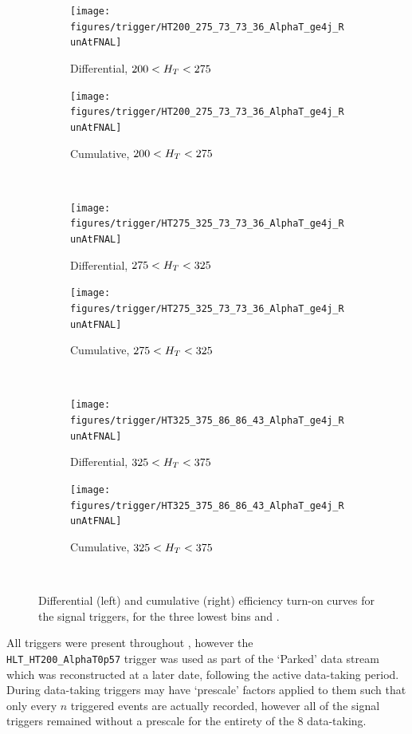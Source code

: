 \begin{figure}[p!]
  \centering
    \begin{subfigure}[b]{0.48\textwidth}
      \texttt{[image: figures/trigger/HT200\_275\_73\_73\_36\_AlphaT\_ge4j\_RunAtFNAL]}
      \caption{Differential, $200 < H_T < 275 $~\gev}
    \end{subfigure}
    \begin{subfigure}[b]{0.48\textwidth}
      \texttt{[image: figures/trigger/HT200\_275\_73\_73\_36\_AlphaT\_ge4j\_RunAtFNAL]}
      \caption{Cumulative, $200 < H_T < 275 $~\gev}
    \end{subfigure} \\
    \begin{subfigure}[b]{0.48\textwidth}
      \texttt{[image: figures/trigger/HT275\_325\_73\_73\_36\_AlphaT\_ge4j\_RunAtFNAL]}
      \caption{Differential, $275 < H_T < 325 $~\gev}
    \end{subfigure}
    \begin{subfigure}[b]{0.48\textwidth}
      \texttt{[image: figures/trigger/HT275\_325\_73\_73\_36\_AlphaT\_ge4j\_RunAtFNAL]}
      \caption{Cumulative, $275 < H_T < 325 $~\gev}
    \end{subfigure} \\
    \begin{subfigure}[b]{0.48\textwidth}
      \texttt{[image: figures/trigger/HT325\_375\_86\_86\_43\_AlphaT\_ge4j\_RunAtFNAL]}
      \caption{Differential, $325 < H_T < 375 $~\gev}
    \end{subfigure}
    \begin{subfigure}[b]{0.48\textwidth}
      \texttt{[image: figures/trigger/HT325\_375\_86\_86\_43\_AlphaT\_ge4j\_RunAtFNAL]}
      \caption{Cumulative, $325 < H_T < 375 $~\gev}
    \end{subfigure} \\
  
    \caption{\label{fig:eff_alphat_ge4j}
      Differential (left) and cumulative (right) efficiency turn-on curves for 
      the signal triggers, for the three lowest \HT bins and \njhigh.}
\end{figure}

All triggers were present throughout \runone, however the 
\\\verb!HLT_HT200_AlphaT0p57! trigger was used as part of the `Parked' data
stream which was reconstructed at a later date, following the active data-taking
period. During data-taking triggers may have `prescale' factors applied to them 
such that only every $n$ triggered events are actually recorded, however all of
the signal triggers remained without a prescale for the entirety of the 8 \tev
data-taking.


